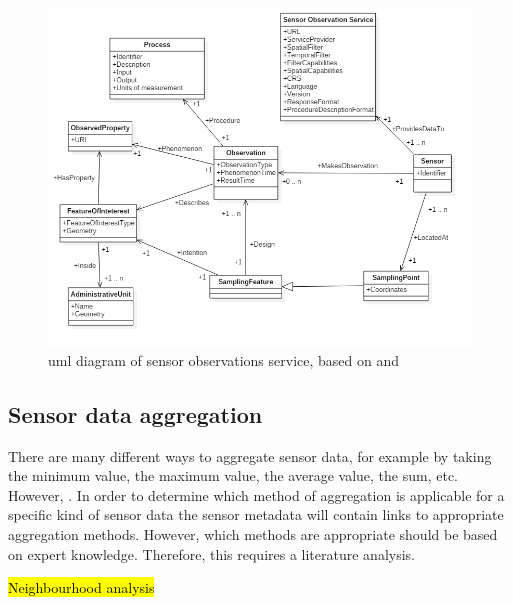 \begin{figure}
	\centering
	\includegraphics[width=1\linewidth]{figs/UML_Diagram.png}
	\caption{\ac{uml} diagram of sensor observations service, based on \cite{SSW:Cox3} and \cite{SDI:INSPIRE2}}
	\label{fig:UML}
\end{figure}

\subsection{Sensor data aggregation}
There are many different ways to aggregate sensor data, for example by taking the minimum value, the maximum value, the average value, the sum, etc. However, . In order to determine which method of aggregation is applicable for a specific kind of sensor data the sensor metadata will contain links to appropriate aggregation methods. However, which methods are appropriate should be based on expert knowledge. Therefore, this requires a literature analysis. 

\hl{Neighbourhood analysis}

